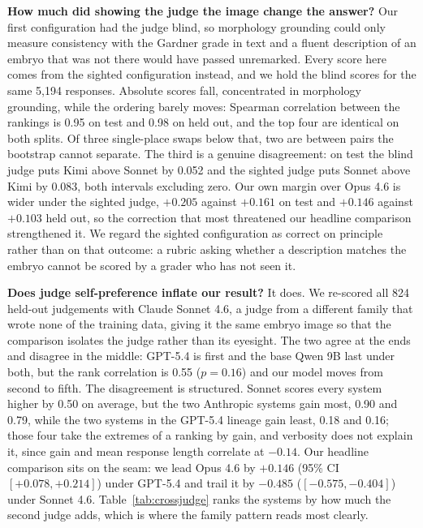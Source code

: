 \documentclass[11pt]{article}
\begin{document}
\textbf{How much did showing the judge the image change the answer?} Our first
configuration had the judge blind, so morphology grounding could only measure
consistency with the Gardner grade in text and a fluent description of an embryo
that was not there would have passed unremarked. Every score here comes from the
sighted configuration instead, and we hold the blind scores for the same 5,194
responses. Absolute scores fall, concentrated in morphology grounding, while the
ordering barely moves: Spearman correlation between the rankings is 0.95 on test
and 0.98 on held out, and the top four are identical on both splits. Of three
single-place swaps below that, two are between pairs the bootstrap cannot
separate. The third is a genuine disagreement: on test the blind judge puts Kimi
above Sonnet by 0.052 and the sighted judge puts Sonnet above Kimi by 0.083, both
intervals excluding zero. Our own margin over Opus 4.6 is wider under the sighted
judge, $+0.205$ against $+0.161$ on test and $+0.146$ against $+0.103$ held out,
so the correction that most threatened our headline comparison strengthened it.
We regard the sighted configuration as correct on principle rather than on that
outcome: a rubric asking whether a description matches the embryo cannot be
scored by a grader who has not seen it.

\textbf{Does judge self-preference inflate our result?} It does. We re-scored all
824 held-out judgements with Claude Sonnet 4.6, a judge from a different family
that wrote none of the training data, giving it the same embryo image so that the
comparison isolates the judge rather than its eyesight. The two agree at the ends
and disagree in the middle: GPT-5.4 is first and the base Qwen 9B last under
both, but the rank correlation is 0.55 ($p{=}0.16$) and our model moves from
second to fifth. The disagreement is structured. Sonnet scores every system
higher by 0.50 on average, but the two Anthropic systems gain most, 0.90 and
0.79, while the two systems in the GPT-5.4 lineage gain least, 0.18 and 0.16;
those four take the extremes of a ranking by gain, and verbosity does not explain
it, since gain and mean response length correlate at $-0.14$. Our headline
comparison sits on the seam: we lead Opus 4.6 by $+0.146$ (95\% CI $[+0.078,
+0.214]$) under GPT-5.4 and trail it by $-0.485$ ($[-0.575, -0.404]$) under
Sonnet 4.6. Table~\ref{tab:crossjudge} ranks the systems by how much the second
judge adds, which is where the family pattern reads most clearly.
\end{document}

